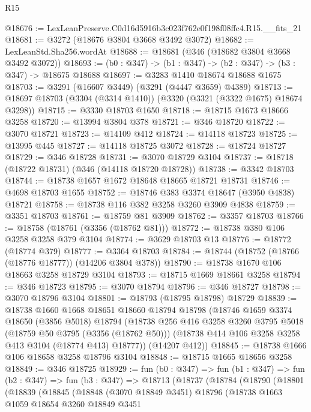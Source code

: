 \begin{lexlean}{R15}
\begin{coremodule}
@18676 := LexLeanPreserve.C0d16d5916b3c023f762e0f198f08ffc4.R15.__fits_21
@18681 := @3272 (@18676 @3804 @3668 @3492 @3072)
@18682 := LexLeanStd.Sha256.wordAt
@18688 := @18681 (@346 (@18682 @3804 @3668 @3492 @3072))
@18693 := (b0 : @347) -> (b1 : @347) -> (b2 : @347) -> (b3 : @347) -> @18675 @18688
@18697 := @3283 @1410 @18674 @18688 @1675
@18703 := @3291 (@16607 @3449) (@3291 (@4447 @3659) @4389)
@18713 := @18697 @18703 (@3304 (@3314 @1410)) (@3320 (@3321 (@3322 @1675) @18674 @3298))
@18715 := @3330 @18703 @1650
@18718 := @18715 @1673 @18666 @3258
@18720 := @13994 @3804 @378
@18721 := @346 @18720
@18722 := @3070 @18721
@18723 := @14109 @412
@18724 := @14118 @18723
@18725 := @13995 @445
@18727 := @14118 @18725 @3072
@18728 := @18724 @18727
@18729 := @346 @18728
@18731 := @3070 @18729 @3104
@18737 := @18718 (@18722 @18731) (@346 (@14118 @18720 @18728))
@18738 := @3342 @18703
@18744 := @18738 @1657 @1672 @18648 @18665 @18721 @18731
@18746 := @4698 @18703 @1655
@18752 := @18746 @383 @3374 @18647 (@3950 @4838) @18721
@18758 := @18738 @116 @382 @3258 @3260 @3909 @4838
@18759 := @3351 @18703
@18761 := @18759 @81 @3909
@18762 := @3357 @18703
@18766 := @18758 (@18761 (@3356 (@18762 @81)))
@18772 := @18738 @380 @106 @3258 @3258 @379 @3104
@18774 := @3629 @18703 @13
@18776 := @18772 (@18774 @379)
@18777 := @3364 @18703
@18784 := @18744 (@18752 (@18766 (@18776 @18777)) (@14206 @3804 @378))
@18790 := @18738 @1670 @106 @18663 @3258 @18729 @3104
@18793 := @18715 @1669 @18661 @3258
@18794 := @346 @18723
@18795 := @3070 @18794
@18796 := @346 @18727
@18798 := @3070 @18796 @3104
@18801 := @18793 (@18795 @18798) @18729
@18839 := @18738
    @1660
    @1668
    @18651
    @18660
    @18794
    @18798
    (@18746
      @1659
      @3374
      @18650
      (@3856 @5018)
      @18794
      (@18738
        @256
        @416
        @3258
        @3260
        @3795
        @5018
        (@18759 @50 @3795 (@3356 (@18762 @50)))
        (@18738 @414 @106 @3258 @3258 @413 @3104 (@18774 @413) @18777))
      (@14207 @412))
@18845 := @18738 @1666 @106 @18658 @3258 @18796 @3104
@18848 := @18715 @1665 @18656 @3258
@18849 := @346 @18725
@18929 := fun (b0 : @347) =>
  fun (b1 : @347) =>
  fun (b2 : @347) =>
  fun (b3 : @347) =>
  @18713
    (@18737
      (@18784
        (@18790
          (@18801
            (@18839
              (@18845
                (@18848
                  (@3070 @18849 @3451)
                  @18796
                  (@18738
                    @1663
                    @1059
                    @18654
                    @3260
                    @18849
                    @3451

\end{coremodule}
\end{lexlean}

